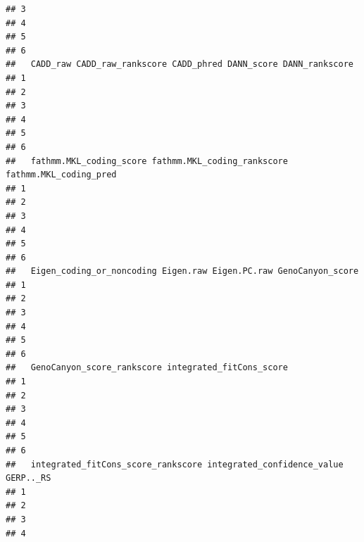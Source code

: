 \documentclass[
]{article}
\begin{document}
\begin{verbatim}
## 3                                                                    
## 4                                                                    
## 5                                                                    
## 6                                                                    
##   CADD_raw CADD_raw_rankscore CADD_phred DANN_score DANN_rankscore
## 1                                                                 
## 2                                                                 
## 3                                                                 
## 4                                                                 
## 5                                                                 
## 6                                                                 
##   fathmm.MKL_coding_score fathmm.MKL_coding_rankscore fathmm.MKL_coding_pred
## 1                                                                           
## 2                                                                           
## 3                                                                           
## 4                                                                           
## 5                                                                           
## 6                                                                           
##   Eigen_coding_or_noncoding Eigen.raw Eigen.PC.raw GenoCanyon_score
## 1                                                                  
## 2                                                                  
## 3                                                                  
## 4                                                                  
## 5                                                                  
## 6                                                                  
##   GenoCanyon_score_rankscore integrated_fitCons_score
## 1                                                    
## 2                                                    
## 3                                                    
## 4                                                    
## 5                                                    
## 6                                                    
##   integrated_fitCons_score_rankscore integrated_confidence_value GERP.._RS
## 1                                                                         
## 2                                                                         
## 3                                                                         
## 4                                                                         

\end{verbatim}
\end{document}
